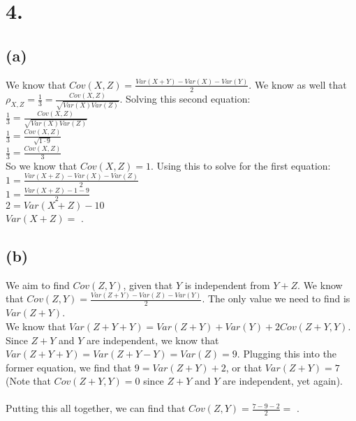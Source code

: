 \documentclass{article}
\begin{document}
\section*{4.}
{\Large 

\subsection*{(a)}
We know that $Cov(X,Z) = \frac{Var(X + Y) - Var(X) - Var(Y)}{2}$. We know as well that $\rho_{X, Z} = \frac{1}{3} = \frac{Cov(X, Z)}{\sqrt{Var(X)Var(Z)}}$. Solving this second equation: \\
$\frac{1}{3} = \frac{Cov(X,Z)}{\sqrt{Var(X)Var(Z)}}$ \\
$\frac{1}{3} = \frac{Cov(X,Z)}{\sqrt{1 \cdot 9}}$ \\
$\frac{1}{3} = \frac{Cov(X,Z)}{3}$ \\
So we know that $Cov(X, Z) = 1$. Using this to solve for the first equation: \\
$1 = \frac{Var(X + Z) - Var(X) - Var(Z)}{2}$ \\
$1 = \frac{Var(X + Z) - 1 - 9}{2}$ \\
$2 = Var(X + Z) - 10$ \\
$Var(X + Z) = $ .

\subsection*{(b)}
We aim to find $Cov(Z, Y)$, given that $Y$ is independent from $Y + Z$. We know that $Cov(Z, Y) = \frac{Var(Z + Y) - Var(Z) - Var(Y)}{2}$. The only value we need to find is $Var(Z+Y)$. \\
We know that $Var(Z + Y + Y) = Var(Z + Y) + Var(Y) + 2Cov(Z + Y, Y)$. Since $Z+Y$ and $Y$ are independent, we know that $Var(Z + Y + Y) = Var(Z + Y - Y) = Var(Z) = 9$. Plugging this into the former equation, we find that $9 = Var(Z+Y) + 2$, or that $Var(Z + Y) = 7$ (Note that $Cov(Z+Y, Y) = 0$ since $Z+Y$ and $Y$ are independent, yet again). \\ \\
Putting this all together, we can find that $Cov(Z, Y) = \frac{7 - 9 - 2}{2} = $ .

}
\end{document}
